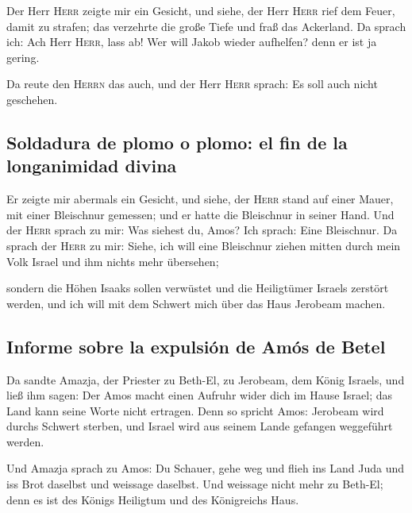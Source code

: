 Der Herr \textsc{Herr} zeigte mir ein Gesicht, und siehe,
der Herr \textsc{Herr} rief dem Feuer, damit zu strafen; das verzehrte
die große Tiefe und fraß das Ackerland.  Da sprach ich:
Ach Herr \textsc{Herr}, lass ab! Wer will Jakob wieder aufhelfen? denn
er ist ja gering.

 Da reute den \textsc{Herrn} das auch, und der Herr
\textsc{Herr} sprach: Es soll auch nicht geschehen.

\hypertarget{soldadura-de-plomo-o-plomo-el-fin-de-la-longanimidad-divina}{%
\subsection{Soldadura de plomo o plomo: el fin de la longanimidad
divina}\label{soldadura-de-plomo-o-plomo-el-fin-de-la-longanimidad-divina}}

 Er zeigte mir abermals ein Gesicht, und siehe, der
\textsc{Herr} stand auf einer Mauer, mit einer Bleischnur gemessen; und
er hatte die Bleischnur in seiner Hand.  Und der
\textsc{Herr} sprach zu mir: Was siehest du, Amos? Ich sprach: Eine
Bleischnur. Da sprach der \textsc{Herr} zu mir: Siehe, ich will eine
Bleischnur ziehen mitten durch mein Volk Israel und ihm nichts mehr
übersehen;

 sondern die Höhen Isaaks sollen verwüstet und die
Heiligtümer Israels zerstört werden, und ich will mit dem Schwert mich
über das Haus Jerobeam machen.

\hypertarget{informe-sobre-la-expulsiuxf3n-de-amuxf3s-de-betel}{%
\subsection{Informe sobre la expulsión de Amós de
Betel}\label{informe-sobre-la-expulsiuxf3n-de-amuxf3s-de-betel}}

 Da sandte Amazja, der Priester zu Beth-El, zu Jerobeam,
dem König Israels, und ließ ihm sagen: Der Amos macht einen Aufruhr
wider dich im Hause Israel; das Land kann seine Worte nicht ertragen.
 Denn so spricht Amos: Jerobeam wird durchs Schwert
sterben, und Israel wird aus seinem Lande gefangen weggeführt werden.

 Und Amazja sprach zu Amos: Du Schauer, gehe weg und
flieh ins Land Juda und iss Brot daselbst und weissage daselbst.
 Und weissage nicht mehr zu Beth-El; denn es ist des
Königs Heiligtum und des Königreichs Haus.

